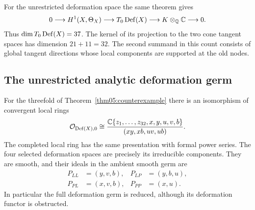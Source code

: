 For the unrestricted deformation space the same theorem gives
\begin{equation}\label{eq05:globaltangent}
 0\longrightarrow H^1(X,\Theta_X)
 \longrightarrow T_0\operatorname{Def}(X)
 \longrightarrow K\otimes_{\mathbb{Q}}\mathbb{C}\longrightarrow0.
\end{equation}
Thus $\dim T_0\operatorname{Def}(X)=37$.  The kernel of its projection to the two
cone tangent spaces has dimension $21+11=32$.  The second summand in
this count consists of global tangent directions whose local
components are supported at the old nodes.

\subsection{The unrestricted analytic deformation germ}

\begin{theorem}\label{thm05:germ}
For the threefold of Theorem~\ref{thm05:counterexample} there is an
isomorphism of convergent local rings
\begin{equation}\label{eq05:normalform}
 \mathcal{O}_{\operatorname{Def}(X),0}\cong
 \frac{\mathbb{C}\{z_1,\ldots,z_{32},x,y,u,v,b\}}
 {(xy,xb,uv,ub)}.
\end{equation}
The completed local ring has the same presentation with formal power
series.  The four selected deformation spaces are precisely its
irreducible components.  They are smooth, and their ideals in the
ambient smooth germ are
\begin{equation}\label{eq05:componentideals}
 \begin{aligned}
 P_{LL}&=(y,v,b),& P_{LP}&=(y,b,u),\\
 P_{PL}&=(x,v,b),& P_{PP}&=(x,u).
 \end{aligned}
\end{equation}
In particular the full deformation germ is reduced, although its
deformation functor is obstructed.
\end{theorem}

